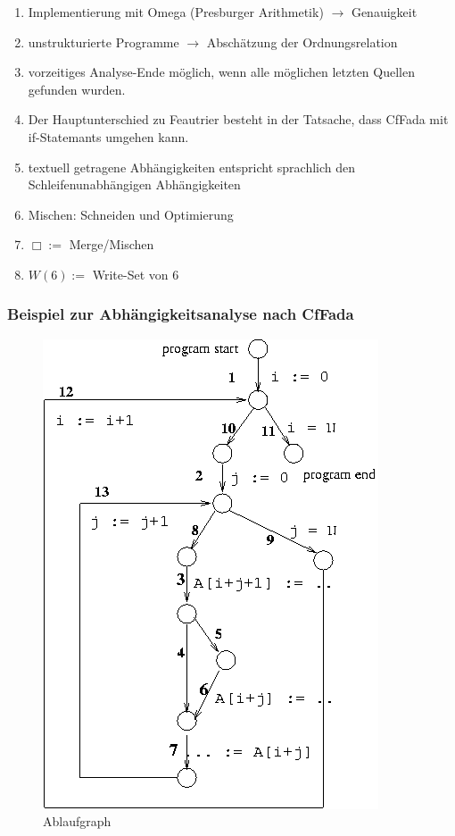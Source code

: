 \begin{enumerate}
    \item Implementierung mit Omega (Presburger Arithmetik) \( \rightarrow \) Genauigkeit
    \item unstrukturierte Programme \( \rightarrow \) Abschätzung der Ordnungsrelation
    \item vorzeitiges Analyse-Ende möglich, wenn alle möglichen letzten Quellen gefunden wurden.
    \item Der Hauptunterschied zu Feautrier besteht in der Tatsache, dass CfFada mit if-Statemants umgehen kann.
    \item textuell getragene Abhängigkeiten entspricht sprachlich den Schleifenunabhängigen Abhängigkeiten
    \item Mischen: Schneiden und Optimierung
    \item \( \Box := \) Merge/Mischen
    \item \( W(6) := \) Write-Set von 6
\end{enumerate}


\subsubsection{Beispiel zur Abhängigkeitsanalyse nach CfFada}

\begin{figure}
    \begin{flushright}
        \includegraphics[scale=0.5]{images/cffada.png}
        \caption{Ablaufgraph}
        \vspace{+40pt}
    \end{flushright}

\end{figure}

